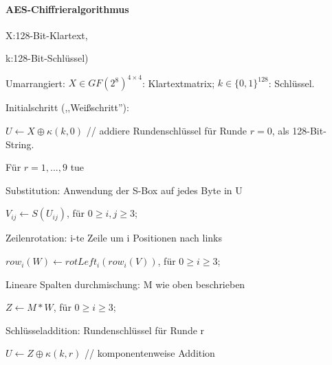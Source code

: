 \documentclass[a4paper]{article}
\begin{document}
\begin{multicols}{3}
    \paragraph{AES-Chiffrieralgorithmus}
    \begin{itemize*}
        \item X:128-Bit-Klartext,
        \item k:128-Bit-Schlüssel)
        \item Umarrangiert: $X\in GF(2^8)^{4\times 4}$: Klartextmatrix; $k\in\{0,1\}^{128}$: Schlüssel.
        \begin{enumerate*}
            \item Initialschritt (,,Weißschritt''):
            \begin{itemize*}
                \item $U\leftarrow X\oplus \kappa (k,0)$ // addiere Rundenschlüssel für Runde $r=0$, als 128-Bit-String.
            \end{itemize*}
            \item Für $r=1,...,9$ tue
            \begin{enumerate*}
                \item Substitution: Anwendung der S-Box auf jedes Byte in U
                \begin{itemize*}
                    \item $V_{ij}\leftarrow S(U_{ij})$, für $0\geq i,j\geq 3$;
                \end{itemize*}
                \item Zeilenrotation: i-te Zeile um i Positionen nach links
                \begin{itemize*}
                    \item $row_i(W)\leftarrow rotLeft_i(row_i(V))$, für $0\geq i\geq 3$;
                \end{itemize*}
                \item Lineare Spalten durchmischung: M wie oben beschrieben
                \begin{itemize*}
                    \item $Z\leftarrow M*W$, für $0\geq i\geq 3$;
                \end{itemize*}
                \item Schlüsseladdition: Rundenschlüssel für Runde r
                \begin{itemize*}
                    \item $U\leftarrow Z\oplus \kappa (k,r)$ // komponentenweise Addition

\end{itemize*}
\end{enumerate*}
\end{enumerate*}
\end{itemize*}
\end{multicols}
\end{document}
